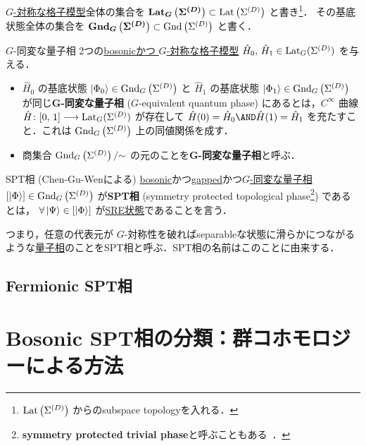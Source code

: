 \documentclass[TQFT_main]{subfiles}
\begin{document}
\hyperref[def:blat-G-equiv]{$G$-対称な格子模型}全体の集合を $\bm{\mathrm{Lat}_{G}\left(\Sigma^{(D)}\right)} \subset \mathrm{Lat}\left(\Sigma^{(D)}\right)$ と書き\footnote{$\mathrm{Lat}\left(\Sigma^{(D)}\right)$ からのsubspace topologyを入れる．}．
その基底状態全体の集合を $\bm{\mathrm{Gnd}_{G}\left(\Sigma^{(D)}\right)} \subset \mathrm{Gnd}\left(\Sigma^{(D)}\right)$ と書く．

\begin{mydef}[label=def:Gequiv-bqp]{$G$-同変な量子相}
    2つの\hyperref[def:bosonic-lattice-model]{bosonicかつ $G$-対称な格子模型} $\hat{H}_0,\, \hat{H}_1 \in \mathrm{Lat}_G(\Sigma^{(D)})$ を与える．
    \begin{itemize}
        \item $\hat{H}_0$ の基底状態 $\ket{\Phi_0} \in \mathrm{Gnd}_{G}\left(\Sigma^{(D)}\right)$ と $\hat{H}_1$ の基底状態 $\ket{\Phi_1} \in \mathrm{Gnd}_{G}\left(\Sigma^{(D)}\right)$ が同じ\textbf{$\bm{G}$-同変な量子相} ($G$-equivalent quantum phase) にあるとは，$C^\infty$ 曲線 $\hat{H} \colon [0,\, 1] \longrightarrow \mathrm{Lat}_G(\Sigma^{(D)})$ が存在して
            $\hat{H}(0) = \hat{H}_0 \AND \hat{H}(1) = \hat{H}_1$ を充たすこと．これは $\mathrm{Gnd}_{G}\left(\Sigma^{(D)}\right)$ 上の同値関係を成す．
        \item 商集合 $\mathrm{Gnd}_{G}\left(\Sigma^{(D)}\right)/{\sim}$ の元のことを\textbf{$\bm{G}$-同変な量子相}と呼ぶ．
    \end{itemize}
\end{mydef}

\begin{mydef}[label=def:SPT-traditional]{SPT相 (Chen-Gu-Wenによる)}
    \hyperref[def:bosonic-lattice-model]{bosonic}かつ\hyperref[def:gapped]{gapped}かつ\hyperref[def:blat-G-equiv]{$G$-同変な量子相} $[\ket{\Phi}] \in \mathrm{Gnd}_{G}\left(\Sigma^{(D)}\right)$ が\textbf{SPT相} (symmetry protected topological phase\footnote{\textbf{symmetry protected trivial phase}と呼ぶこともある~\cite{Wen2014SPT}．}) であるとは，
    $\forall \ket{\Psi} \in [\ket{\Phi}]$ が\hyperref[def:SRE]{SRE状態}であることを言う．
\end{mydef}
つまり，任意の代表元が $G$-対称性を破ればseparableな状態に滑らかにつながるような\hyperref[def:Gequiv-bqp]{量子相}のことをSPT相と呼ぶ．SPT相の名前はこのことに由来する．


\subsection{Fermionic SPT相}

\section{Bosonic SPT相の分類：群コホモロジーによる方法}
\end{document}
